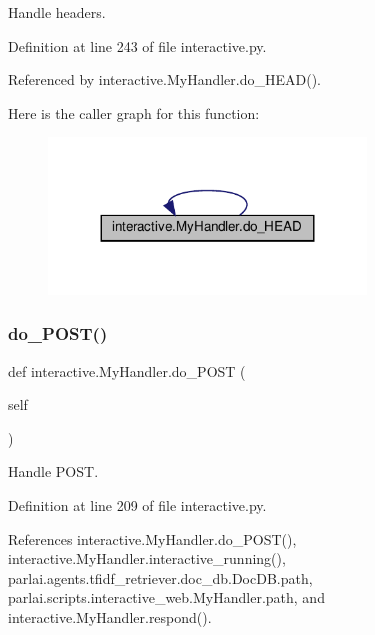 \begin{DoxyVerb}Handle headers.\end{DoxyVerb}
 

Definition at line 243 of file interactive.\+py.



Referenced by interactive.\+My\+Handler.\+do\+\_\+\+H\+E\+A\+D().

Here is the caller graph for this function\+:
\nopagebreak
\begin{figure}[H]
\begin{center}
\leavevmode
\includegraphics[width=239pt]{classinteractive_1_1MyHandler_a6255cc42ad4ffd494808bed1c0e2b3fb_icgraph}
\end{center}
\end{figure}
\mbox{\label{classinteractive_1_1MyHandler_a59070990ac52dada4b7c532f76af749f}} 
\subsubsection{\texorpdfstring{do\+\_\+\+P\+O\+S\+T()}{do\_POST()}\hspace{0.1cm}{\footnotesize\ttfamily [1/2]}}
{\footnotesize\ttfamily def interactive.\+My\+Handler.\+do\+\_\+\+P\+O\+ST (\begin{DoxyParamCaption}\item[{}]{self }\end{DoxyParamCaption})}

\begin{DoxyVerb}Handle POST.\end{DoxyVerb}
 

Definition at line 209 of file interactive.\+py.



References interactive.\+My\+Handler.\+do\+\_\+\+P\+O\+S\+T(), interactive.\+My\+Handler.\+interactive\+\_\+running(), parlai.\+agents.\+tfidf\+\_\+retriever.\+doc\+\_\+db.\+Doc\+D\+B.\+path, parlai.\+scripts.\+interactive\+\_\+web.\+My\+Handler.\+path, and interactive.\+My\+Handler.\+respond().

